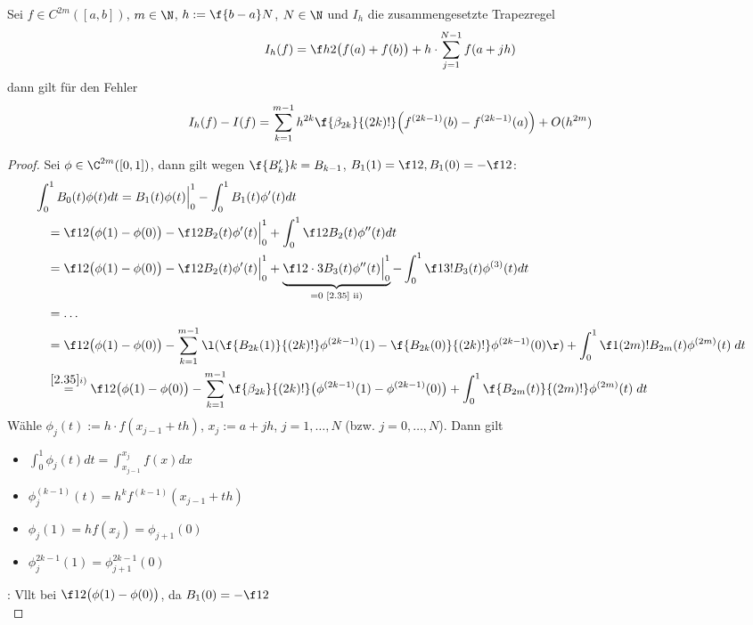 \documentclass[11pt]{scrbook}
\begin{document}
\begin{st}
	Sei $f\in C^{2m}([a,b])$, $m\in \N$, $h:= \f {b-a}N$, $N\in \N$ und $I_h$ die zusammengesetzte Trapezregel
	\[
		I_h(f) = \f h2 \big(f(a) + f(b)\big) + h \cdot \sum_{j=1}^{N-1} f(a+jh)
	\]
	dann gilt für den Fehler
	\[
		I_h(f) - I(f) = \sum_{k=1}^{m-1} h^{2k} \f{\beta_{2k}}{(2k)!} \Big( f^{(2k-1)}(b) - f^{(2k-1)}(a) \Big) + O(h^{2m})
	\]
	\begin{proof}
		Sei $\phi \in \C^{2m}([0,1])$, dann gilt wegen $\f{B_k'}k = B_{k-1}$, $B_1(1) = \f 12, B_1(0) = - \f 12$:
		\begin{align*}
			&\int_0^1 B_0(t) \phi(t) dt 
			= B_1(t) \phi(t) \Big|_{0}^1 - \int_0^1 B_1(t) \phi'(t) dt \\
			&\quad= \f 12 \big( \phi(1) - \phi(0) \big) - \f 12 B_2(t) \phi'(t) \Big|_0^1 + \int_0^1 \f 12 B_2(t) \phi''(t) dt \\
			&\quad= \f 12 \big( \phi(1) - \phi(0) \big) - \f 12 B_2(t) \phi'(t) \Big|_0^1 + \underbrace{\f 1{2\cdot 3} B_3(t) \phi''(t) \Big|_0^1}_{=0 \text{ \ref{2.35} ii)}} - \int_0^1 \f 1{3!} B_3(t) \phi^{(3)}(t) dt \\
			&\quad= \dotsc \\
			&\quad= \f 12 \big( \phi(1) - \phi(0) \big) - \sum_{k=1}^{m-1} \l( \f {B_{2k}(1)}{(2k)!} \phi^{(2k-1)}(1) - \f {B_{2k}(0)}{(2k)!} \phi^{(2k-1)}(0) \r) + \int_0^1 \f 1{(2m)!} B_{2m}(t) \phi^{(2m)}(t) \; dt \\
			&\quad\stackrel{\ref{2.35} i)}=  \f 12 \big(\phi(1) - \phi(0)\big) - \sum_{k=1}^{m-1} \f {\beta_{2k}}{(2k)!} \big( \phi^{(2k-1)}(1) - \phi^{(2k-1)}(0) \big) + \int_0^1 \f {B_{2m}(t)}{(2m)!} \phi^{(2m)}(t) \; dt
		\end{align*}
		Wähle  $\phi_j(t) := h \cdot f(x_{j-1} + th)$, $x_j := a+jh$, $j=1,\dotsc, N$ (bzw. $j=0,\dotsc, N$).
		Dann gilt
		\begin{itemize}
			\item
				$\displaystyle
				\int_0^1 \phi_j(t) dt = \int_{x_{j-1}}^{x_j} f(x) dx
				$
			\item
				$\displaystyle
				\phi_j^{(k-1)}(t) = h^k f^{(k-1)}(x_{j-1} + th)
				$
			\item
				$\displaystyle
				\phi_j(1) = h f(x_j) = \phi_{j+1}(0)
				$
			\item
				$\displaystyle
				\phi_j^{2k-1}(1) = \phi_{j+1}^{2k-1}(0)
				$
		\end{itemize}
		: Vllt bei $\f 12 \big( \phi(1) - \phi(0) \big)$, da $B_1(0) = - \f 12$  \\

\end{proof}
\end{st}
\end{document}
